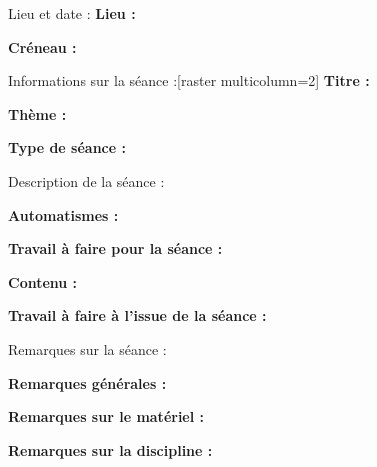 \documentclass[a4paper,11pt,fleqn]{article}
\begin{document}
\setcounter{pagecounter}{0}
\setcounter{ExoMA}{0}
\setcounter{prof}{0}
\def\points{\phantom{AAA}}
\def\difficulty{\phantom{AAA}}
\chapitre[
    ]{
    }{
    }{
    }{
    }{
    }

\begin{tcolorbox}[blank]
	\begin{Colonnes}{3}
		\begin{bfbox}{Lieu et date :}
			\textbf{Lieu :} %
		    
		    
			\textbf{Créneau :} %
		\end{bfbox}
		\begin{bfbox}{Informations sur la séance :}[raster multicolumn=2]
			\textbf{Titre :} %
		
		
		
			\textbf{Thème :} %
		
		
		
			\textbf{Type de séance :} %
		\end{bfbox}
	\end{Colonnes}
\end{tcolorbox}
\begin{bfbox}{Description de la séance :}

	\textbf{Automatismes :} %
	
	\textbf{Travail à faire pour la séance :} 
	\begin{itemize}[label=$\bullet$]
	\end{itemize}
	
	\textbf{Contenu :} 
	\begin{itemize}[label=$\bullet$]

	\end{itemize}
	\textbf{Travail à faire à l'issue de la séance :} 
	\begin{itemize}[label=$\bullet$]
	\end{itemize}
	\vspace{2cm}
\end{bfbox}

\begin{bfbox}{Remarques sur la séance :}

\textbf{Remarques générales :} 






\textbf{Remarques sur le matériel :}





\textbf{Remarques sur la discipline :}




\end{bfbox}
\end{document}
